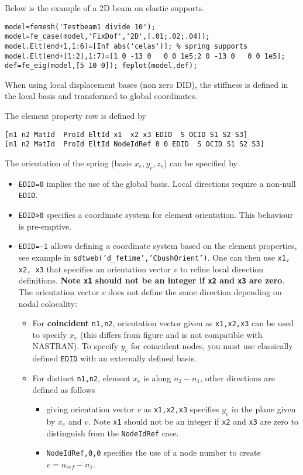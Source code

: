 Below is the example of a 2D beam on elastic supports.
\begin{verbatim}
model=femesh('Testbeam1 divide 10');
model=fe_case(model,'FixDof','2D',[.01;.02;.04]);
model.Elt(end+1,1:6)=[Inf abs('celas')]; % spring supports
model.Elt(end+[1:2],1:7)=[1 0 -13 0   0 0 1e5;2 0 -13 0   0 0 1e5];
def=fe_eig(model,[5 10 0]); feplot(model,def);
\end{verbatim}%

When using local displacement bases (non zero DID), the stiffness is defined in the local basis and transformed to global coordinates.


The element property row is defined by 

\begin{verbatim}
[n1 n2 MatId  ProId EltId x1  x2 x3 EDID  S OCID S1 S2 S3]
[n1 n2 MatId  ProId EltId NodeIdRef 0 0 EDID  S OCID S1 S2 S3]
\end{verbatim}

The orientation of the spring (basis $x_e,y_e,z_e$) can be specified by 
\begin{itemize}
\item {\tt EDID=0} implies the use of the global basis. Local directions require a non-null {\tt EDID}.
\item {\tt EDID>0} specifies a coordinate system for element orientation. This behaviour is pre-emptive.
\item {\tt EDID=-1} allows defining a coordinate system based on the element properties, see example in {\tt sdtweb('d\_fetime','CbushOrient')}. One can then use {\tt x1, x2, x3} that specifies an  orientation vector $v$ to refine local direction definitions. {\bf Note {\tt x1} should not be an integer if {\tt x2} and {\tt x3} are zero}. The orientation vector $v$ does not define the same direction depending on nodal colocality:
\begin{itemize}
\item  For {\bf coincident} {\tt n1,n2}, orientation vector given as {\tt x1,x2,x3} can be used to specify $x_e$ (this differs from figure and is not compatible with NASTRAN). To specify $y_e$ for coincident nodes, you must use classically defined {\tt EDID} with an externally defined basis.
\item  For distinct {\tt n1,n2}, element $x_e$ is along $n_2-n_1$, other directions are defined as follows
\begin{itemize}
\item giving orientation vector $v$ as {\tt x1,x2,x3} specifies $y_e$ in the plane given by $x_e$ and $v$. Note {\tt x1} should not be an integer if {\tt x2} and {\tt x3} are zero to distinguish from the {\tt NodeIdRef} case.
\item {\tt NodeIdRef,0,0} specifies the use of a node number to create $v=n_{ref}-n_1$.
\end{itemize}
\end{itemize}
\end{itemize}


